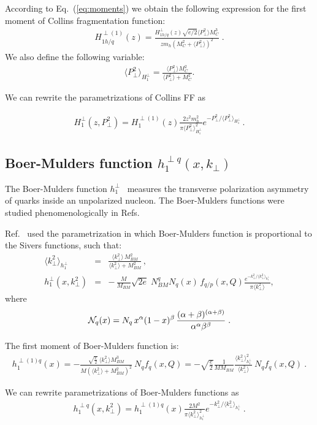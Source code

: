 \documentclass[a4paper,11pt]{article}
\newcommand{\ba}{\begin{eqnarray}}
\newcommand{\ea}{\end{eqnarray}}
\newcommand{\la}{\langle}
\newcommand{\ra}{\rangle}
\def\kperp{k_\perp}
\def\pperp{P_\perp}
\def\avkperp{\la \kperp^2 \ra}
\def\avpperp{\la \pperp^2 \ra}
\begin{document}
According to Eq.~(\ref{eq:moments}) we obtain the following expression for the first moment of
Collins fragmentation function:
\ba
H_{1 h/q}^{\perp (1)}(z) = \frac{H_{1 h/q}^{\perp}(z) \sqrt{e/2}  \avpperp M_C^3}{z m_h  (M_C^2+\avpperp)^2}\; .
\ea
We also define the following variable:
\ba
\avpperp_{H_1^\perp} = \frac{\avpperp M_C^2 }{\avpperp + M_C^2} .
\ea

We can rewrite the parametrizations of Collins FF as

\ba
H_{1}^{\perp}(z,\pperp^2) =  H_{1}^{\perp (1)}(z)   \frac{2 z^2 m_h^2}{\pi \avpperp_{H_{1}^\perp}^2} e^{-\pperp^2/{\avpperp_{H_{1}^\perp}}}
\label{coll-funct_new} \, .
\ea

\subsection{\boldmath Boer-Mulders function $h_{1}^{\perp q}(x,k_\perp)$}
\label{App:basis-h1perp}

The Boer-Mulders function $h_{1}^{\perp}$~\cite{Boer:1997nt} measures
the transverse polarization asymmetry of quarks inside an unpolarized
nucleon. The Boer-Mulders functions were studied phenomenologically in
Refs.~\cite{Barone:2009hw,Barone:2010gk,Barone:2015ksa}

Ref.~\cite{Barone:2010gk} used the parametrization in which Boer-Mulders function is proportional to the Sivers functions, such that:
\ba
\avkperp_{h_1^\perp} &=& \frac{\avkperp \, M^2_{BM}}{\avkperp + M^2_{BM}} \, , \\
h_{1}^{\perp}(x, \kperp^2) &= &
- \,\frac{M}{M_{BM}}
\sqrt{2e}\; N_{BM}^q N_q (x)
\, f_{q/p} (x, Q)\frac{e^{-\kperp^2/\avkperp_{h_{1}^{\perp}}}}{\pi\avkperp},
\label{BM-dist}
\ea
 where
%
\ba
{\cal N}_q(x)= N_q \, x^{\alpha} (1-x)^{\beta} \,
\frac{(\alpha + \beta)^{(\alpha +\beta)}}
{\alpha^{\alpha} \beta^{\beta}}\; .
 \ea

The first moment of Boer-Mulders function is:
\ba
h_{1}^{\perp (1) q}(x)  = -\frac{\sqrt{\frac{e}{2}} \ \avkperp M_{BM}^3}{M (\avkperp + M_{BM}^2)^2}  \ {N}_q f_q(x, Q) = -\sqrt{\frac{e}{2}} \frac{1}{M M_{BM}}  \frac{\avkperp_{h_1^\perp}^2}{\avkperp}    \ {N}_q  f_q(x, Q)
\label{bm} \ .
\ea

We can rewrite parametrizations of Boer-Mulders functions as
\ba
h_{1}^{\perp q}(x,\kperp^2) =  h_{1}^{\perp (1) q}(x)   \frac{2 M^2}{\pi \avkperp_{h_{1}^\perp}^2} e^{-\kperp^2/{\avkperp_{h_{1}^\perp}}}\label{bm_new} \ .
\ea
\end{document}
